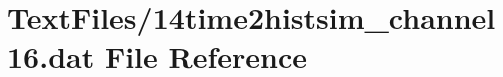 \hypertarget{14time2histsim__channel16_8dat}{}\section{Text\+Files/14time2histsim\+\_\+channel16.dat File Reference}
\label{14time2histsim__channel16_8dat}
